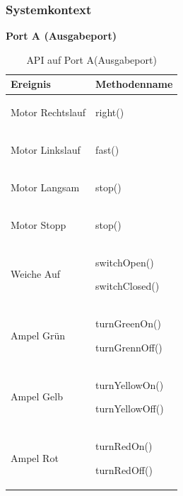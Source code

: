 \documentclass[a4paper, 11pt]{article}
\begin{document}
\subsubsection{Systemkontext}
\textbf{Port A (Ausgabeport)}
\begin{table}[h]
\center
\begin{tabularx}{\textwidth}{|X|X|}
\hline
\textbf{Ereignis}&\textbf{Methodenname}\\
\hline
Motor Rechtslauf&\begin{compactenum}[]
           \item \ttfamily right()
           \end{compactenum}\\
\hline
Motor Linkslauf&\begin{compactenum}[]
           \item \ttfamily fast()
           \end{compactenum}\\
\hline
Motor Langsam&\begin{compactenum}[]
           \item \ttfamily stop()
           \end{compactenum}\\
\hline
Motor Stopp&\begin{compactenum}[]
           \item \ttfamily stop()
           \end{compactenum}\\
\hline
Weiche Auf&\begin{compactenum}[]
           \item \ttfamily switchOpen()
           \item \ttfamily switchClosed()
           \end{compactenum}\\
\hline
Ampel Grün&\begin{compactenum}[]
           \item \ttfamily turnGreenOn()
           \item \ttfamily turnGrennOff()
           \end{compactenum}\\
\hline
Ampel Gelb&\begin{compactenum}[]
           \item \ttfamily turnYellowOn()
           \item \ttfamily turnYellowOff()
           \end{compactenum}\\
\hline
Ampel Rot&\begin{compactenum}[]
           \item \ttfamily turnRedOn()
           \item \ttfamily turnRedOff()
           \end{compactenum}\\
\hline
\end{tabularx}
\caption{API auf Port A(Ausgabeport)}
\label{portA}
\end{table}
\end{document}
